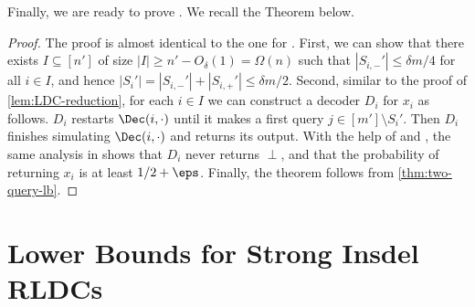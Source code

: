 Finally, we are ready to prove . We recall the Theorem below. 
\twoqrldcmain*
\begin{proof}
The proof is almost identical to the one for . First, we can show that there exists $I \subseteq [n']$ of size $|I| \ge n'-O_{\delta}(1) = \Omega(n)$ such that $|S_{i,-}'| \le \delta m/4$ for all $i \in I$, and hence $|S_i'|=|S_{i,-}'|+|S_{i,+}'|\le \delta m/2$. Second, similar to the proof of \cref{lem:LDC-reduction}, for each $i \in I$ we can construct a decoder $D_i$ for $x_i$ as follows. $D_i$ restarts $\Dec(i,\cdot)$ until it makes a first query $j \in [m']\setminus S_i'$. Then $D_i$ finishes simulating $\Dec(i,\cdot)$ and returns its output. With the help of  and , the same analysis in  shows that $D_i$ never returns $\perp$, and that the probability of returning $x_i$ is at least $1/2+\eps$. Finally, the theorem follows from \cref{thm:two-query-lb}. %
\end{proof}

\section{Lower Bounds for Strong Insdel RLDCs}\label{sec:srldc}

